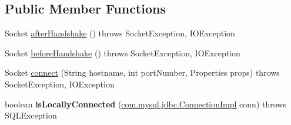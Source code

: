 \subsection*{Public Member Functions}
\begin{DoxyCompactItemize}
\item 
Socket \mbox{\hyperlink{classcom_1_1mysql_1_1jdbc_1_1_standard_socket_factory_a7387cf40cb31ead4c39dcc642d1980b5}{after\+Handshake}} ()  throws Socket\+Exception, I\+O\+Exception 
\item 
Socket \mbox{\hyperlink{classcom_1_1mysql_1_1jdbc_1_1_standard_socket_factory_a0fc01cf46005340dec4113471621f792}{before\+Handshake}} ()  throws Socket\+Exception, I\+O\+Exception 
\item 
Socket \mbox{\hyperlink{classcom_1_1mysql_1_1jdbc_1_1_standard_socket_factory_a3b3577f8cc0de73aa70e6f672e066c6f}{connect}} (String hostname, int port\+Number, Properties props)  throws Socket\+Exception, I\+O\+Exception 
\item 
\mbox{\label{classcom_1_1mysql_1_1jdbc_1_1_standard_socket_factory_a8a03b15bfbb8d948ece475f019e22e83}} 
boolean {\bfseries is\+Locally\+Connected} (\mbox{\hyperlink{classcom_1_1mysql_1_1jdbc_1_1_connection_impl}{com.\+mysql.\+jdbc.\+Connection\+Impl}} conn)  throws S\+Q\+L\+Exception 
\end{DoxyCompactItemize}

